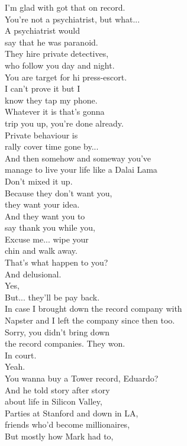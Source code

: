 \documentclass{article}
\begin{document}
\begin{multicols}{3}
I'm glad with got that on record.\\
You're not a psychiatrist, but what...\\
A psychiatrist would\\
say that he was paranoid.\\
They hire private detectives,\\
who follow you day and night.\\
You are target for hi press-escort.\\
I can't prove it but I\\
know they tap my phone.\\
Whatever it is that's gonna\\
trip you up, you're done already.\\
Private behaviour is\\
rally cover time gone by...\\
And then somehow and someway you've\\
manage to live your life like a Dalai Lama\\
Don't mixed it up.\\
Because they don't want you,\\
they want your idea.\\
And they want you to\\
say thank you while you,\\
Excuse me... wipe your\\
chin and walk away.\\
That's what happen to you?\\
And delusional.\\
Yes,\\
But... they'll be pay back.\\
In case I brought down the record company with\\
Napster and I left the company since then too.\\
Sorry, you didn't bring down\\
the record companies. They won.\\
In court.\\
Yeah.\\
You wanna buy a Tower record, Eduardo?\\
And he told story after story\\
about life in Silicon Valley,\\
Parties at Stanford and down in LA,\\
friends who'd become millionaires,\\
But mostly how Mark had to,\\

\end{multicols}
\end{document}
